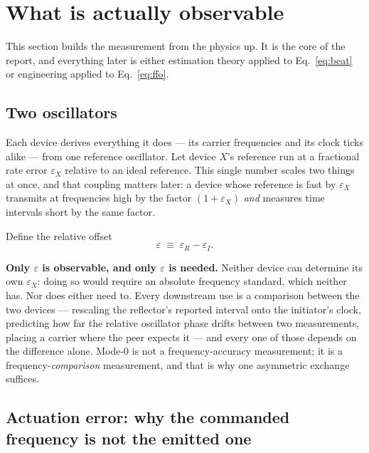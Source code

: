 \documentclass[11pt,a4paper]{article}
\begin{document}
\section{What is actually observable}
\label{sec:observable}

This section builds the measurement from the physics up. It is the core of the report, and everything
later is either estimation theory applied to Eq.~\eqref{eq:beat} or engineering applied to
Eq.~\eqref{eq:ffo}.

\subsection{Two oscillators}

Each device derives everything it does --- its carrier frequencies and its clock ticks alike --- from
one reference oscillator. Let device $X$'s reference run at a fractional rate error $\varepsilon_X$
relative to an ideal reference. This single number scales two things at once, and that coupling
matters later: a device whose reference is fast by $\varepsilon_X$ transmits at frequencies high by
the factor $(1+\varepsilon_X)$ \emph{and} measures time intervals short by the same factor.

Define the relative offset
\begin{equation}
\varepsilon \;\equiv\; \varepsilon_R - \varepsilon_I .
\label{eq:eps}
\end{equation}

\begin{callout}
\textbf{Only $\varepsilon$ is observable, and only $\varepsilon$ is needed.} Neither device can
determine its own $\varepsilon_X$: doing so would require an absolute frequency standard, which
neither has. Nor does either need to. Every downstream use is a comparison between the two devices ---
rescaling the reflector's reported interval onto the initiator's clock, predicting how far the
relative oscillator phase drifts between two measurements, placing a carrier where the peer expects
it --- and every one of those depends on the difference alone. Mode-0 is not a frequency-accuracy
measurement; it is a frequency-\emph{comparison} measurement, and that is why one asymmetric exchange
suffices.
\end{callout}

\subsection{Actuation error: why the commanded frequency is not the emitted one}
\end{document}

